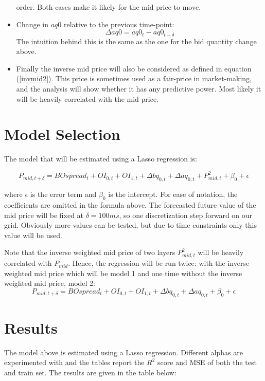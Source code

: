 \documentclass[english, 11pt, a4paper]{article}
\begin{document}
\begin{itemize}
        order. Both cases make it likely for the mid price to move.
    \item Change in $aq0$ relative to the previous time-point:
        \begin{equation}
            \Delta aq0 = aq0_{t} - aq0_{t-\delta} 
        \end{equation}
        The intuition behind this is the same as the one for the bid quantity change above. 
    \item Finally the inverse mid price will also be considered as defined in equation
        (\ref{invmid2}). This price is sometimes used as a fair-price in market-making, and the
        analysis will show whether it has any predictive power. Most likely it will be heavily
        correlated with the mid-price.
\end{itemize}



\section{Model Selection}
The model that will be estimated using a Lasso regression is:

\begin{equation}
    P_{mid, t + \delta} = BOspread_{t} + OI_{0, t} + OI_{1,t} + \Delta bq_{0,t} + \Delta aq_{0,t} +
    P_{mid, t}^2 + \beta_0 + \epsilon 
\end{equation}

where $\epsilon$ is the error term and $\beta_0$ is the intercept. For ease of notation, the
coefficients are omitted in the formula above. The forecasted future value of the mid price will be
fixed at $\delta = 100ms$, so one discretization step forward on our grid. Obviously more values can
be tested, but due to time constraints only this value will be used.

Note that the inverse weighted mid price of two layers $P_{mid, t}^2$ will be heavily correlated with $P_{mid}$. 
Hence, the regression will be run twice: with the inverse weighted mid price which will be model 1
and one time without the inverse weighted mid price, model 2:
\begin{equation}
    P_{mid, t + \delta} = BOspread_{t} + OI_{0, t} + OI_{1,t} + \Delta bq_{0,t} + \Delta aq_{0,t} +
    \beta_0 + \epsilon 
\end{equation}


\section{Results}
The model above is estimated using a Lasso regression. Different alphas are experimented with and
the tables report the $R^2$ score and MSE of both the test and train set. The results are given in
the table below:
\end{document}
